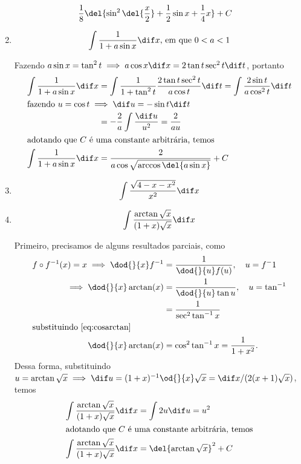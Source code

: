 \documentclass{IMTexam}
\begin{document}
\begin{questions}
\begin{enumerate}[label=(\roman*)]
\begin{solution}
\[\begin{split}
                    \dfrac{1}{8}&\del{\sin^2\del{\dfrac{x}{2}}+\dfrac{1}{2}\sin x+\dfrac{1}{4}x} + C
                \end{split}
                 \]
            \end{solution}
            \item \[ \int \dfrac{1}{1+ a\sin x}\dif x\textup{, em que }0<a<1 \]
            \begin{solution}
                Fazendo $a\sin x = \tan^2 t \implies a\cos x \dif x = 2\tan t\sec^2 t\dif t$, portanto
                \begin{align*}
                    \int \dfrac{1}{1+ a\sin x}\dif x&=\int \dfrac{1}{1+\tan^2
                    t}\dfrac{2\tan t\sec^2 t}{a\cos t}\dif t=\int \dfrac{2\sin
                    t}{a\cos^2 t}\dif t\\
                    \intertext{fazendo $u = \cos t\implies \dif u = - \sin t \dif t$}
                    &=-\dfrac{2}{a}\int
                    \dfrac{\dif u}{u^2}=\dfrac{2}{au}\\
                    \intertext{adotando que $C$ é uma constante arbitrária, temos}
                    \int \dfrac{1}{1+ a\sin x}\dif x&=\dfrac{2}{a\cos
                    \sqrt{\arccos \del{a\sin x}}} + C
                \end{align*}
            \end{solution}
            \item \[ \int \dfrac{\sqrt{4-x-x^2}}{x^2}\dif x \]
            \item \[ \int \dfrac{\arctan{\sqrt{x}}}{(1+x)\sqrt{x}}\dif x \]
            \begin{solution}
                Primeiro, precisamos de alguns resultados parciais, como
                \begin{align*}
                    f\circ f^{-1}(x)=x\implies \dod{}{x}f^{-1}&=\dfrac{1}{\dod{}{u}f(u)},\quad u=f^-1\\
                    \implies \dod{}{x}\arctan(x)&=\dfrac{1}{\dod{}{u}\tan u},\quad u=\tan^{-1}\\
                        &=\dfrac{1}{\sec^2\tan^{-1}x}\\
                    \intertext{substituindo \ref{eq:cosarctan}}
                        \dod{}{x}\arctan(x)&=\cos^2\tan^{-1}x=\dfrac{1}{1+x^2}.
                \end{align*}
                Dessa forma, substituindo $ u = \arctan \sqrt x\implies \dif u = (1+x)^{-1}\od{}{x}\sqrt x = \dif x/(2(x+1)\sqrt x) $, temos
                \begin{align*}
                    \int \dfrac{\arctan{\sqrt{x}}}{(1+x)\sqrt{x}}\dif x&=\int 2u\dif u=u^2\\
                    \intertext{adotando que $C$ é uma constante arbitrária, temos}
                    \int \dfrac{\arctan{\sqrt{x}}}{(1+x)\sqrt{x}}\dif x&=\del{\arctan\sqrt x}^2 + C
                \end{align*}
            \end{solution}
        \end{enumerate}


\end{questions}
\end{document}

